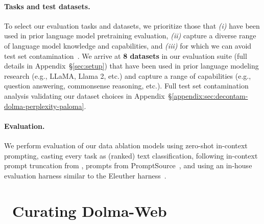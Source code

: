 \paragraph{Tasks and test datasets.} 
To select our evaluation tasks and datasets, we prioritize those that \emph{(i)} have been used in prior language model pretraining evaluation, \emph{(ii)} capture a diverse range of language model knowledge and capabilities, and \emph{(iii)} for which we can avoid test set contamination~\citep{dodge-etal-2021-documenting,Yang2023RethinkingBA}.
We arrive at \textbf{8 datasets} in our evaluation suite (full details in Appendix~\S\ref{sec:setup}) that have been used in prior language modeling research (e.g., LLaMA, Llama 2, etc.) and capture a range of capabilities (e.g., question answering, commonsense reasoning, etc.).  
Full test set contamination analysis validating our dataset choices in Appendix~\S\ref{appendix:sec:decontam-dolma-perplexity-paloma}.

\paragraph{Evaluation.} We perform evaluation of our data ablation models using zero-shot in-context prompting, casting every task as (ranked) text classification, following in-context prompt truncation from \citet{min-etal-2022-metaicl}, prompts from PromptSource~\citep{bach2022promptsource}, and using an in-house evaluation harness similar to the Eleuther harness~\citep{eval-harness}.






































\section{\dolmaWeb~Curating Dolma-Web}
\label{sec:common-crawl}






